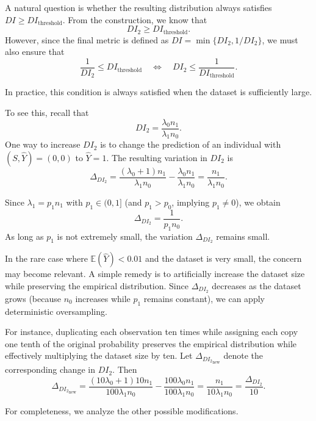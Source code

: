 \documentclass[runningheads, orivec]{llncs}
\begin{document}
A natural question is whether the resulting distribution always satisfies $DI \geq DI_{\text{threshold}}$. From the construction, we know that
\[
DI_2 \geq DI_{\text{threshold}}.
\]
However, since the final metric is defined as $DI = \min\{DI_2,1/DI_2\}$, we must also ensure that
\begin{equation}
\dfrac{1}{DI_2} \leq DI_{\text{threshold}}
\quad \Longleftrightarrow \quad
DI_2 \leq \dfrac{1}{DI_{\text{threshold}}}.
\end{equation}

In practice, this condition is always satisfied when the dataset is sufficiently large.

To see this, recall that
\[
DI_2 = \frac{\lambda_0 n_1}{\lambda_1 n_0}.
\]
One way to increase $DI_2$ is to change the prediction of an individual with $(S,\widehat{Y})=(0,0)$ to $\widehat{Y}=1$. The resulting variation in $DI_2$ is
\begin{equation}
\label{app:eq:change_1}
\Delta_{DI_2} =
\frac{(\lambda_0 +1)n_1}{\lambda_1 n_0}
-
\frac{\lambda_0 n_1}{\lambda_1 n_0}
=
\frac{n_1}{\lambda_1 n_0}.
\end{equation}

Since $\lambda_1 = p_1 n_1$ with $p_1 \in (0,1]$ (and $p_1 > p_0$, implying $p_1 \neq 0$), we obtain
\[
\Delta_{DI_2} = \frac{1}{p_1 n_0}.
\]
As long as $p_1$ is not extremely small, the variation $\Delta_{DI_2}$ remains small.

In the rare case where $\mathbb{E}(\widehat{Y}) < 0.01$ and the dataset is very small, the concern may become relevant. A simple remedy is to artificially increase the dataset size while preserving the empirical distribution. Since $\Delta_{DI_2}$ decreases as the dataset grows (because $n_0$ increases while $p_1$ remains constant), we can apply deterministic oversampling.

For instance, duplicating each observation ten times while assigning each copy one tenth of the original probability preserves the empirical distribution while effectively multiplying the dataset size by ten. Let $\Delta_{{DI_2}_{\text{new}}}$ denote the corresponding change in $DI_2$. Then
\begin{equation}
\Delta_{{DI_2}_{\text{new}}}
=
\frac{(10\lambda_0 +1)10n_1}{100\lambda_1 n_0}
-
\frac{100\lambda_0 n_1}{100\lambda_1 n_0}
=
\frac{n_1}{10\lambda_1 n_0}
=
\frac{\Delta_{DI_2}}{10}.
\end{equation}

For completeness, we analyze the other possible modifications.
\end{document}
